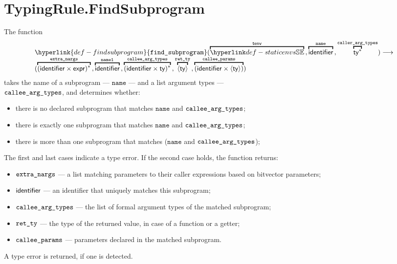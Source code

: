 \documentclass{book}
\newcommand\findsubprogram[0]{\hyperlink{def-findsubprogram}{\texttt{find\_subprogram}}}
\newcommand\nameone[0]{\texttt{name1}}
\newcommand\name[0]{\texttt{name}}
\begin{document}

\section{TypingRule.FindSubprogram \label{sec:TypingRule.FindSubprogram}}
\hypertarget{def-findsubprogram}{}
The function
\[
  \begin{array}{l}
    \findsubprogram(
      \overname{\staticenvs}{\tenv} \aslsep
      \overname{\identifier}{\name} \aslsep
      \overname{\ty^*}{\callerargtypes}
     ) \aslto \\
    (
      \overname{(\identifier\times\expr)^*}{\extranargs} \aslsep
      \overname{\identifier}{\nameone} \aslsep
      \overname{(\identifier\times\ty)^*}{\calleeargtypes} \aslsep
      \overname{\langle\ty\rangle}{\retty} \aslsep
      \overname{(\identifier \times \langle\ty\rangle)}{\calleeparams}
    )
  \end{array}
\]
takes the name of a subprogram --- $\name$ --- and a list argument types --- \\ $\texttt{callee\_arg\_types}$,
and determines whether:
\begin{itemize}
  \item there is no declared subprogram that matches $\name$ and $\texttt{callee\_arg\_types}$;
  \item there is exactly one subprogram that matches $\name$ and $\texttt{callee\_arg\_types}$;
  \item there is more than one subprogram that matches ($\name$ and $\texttt{callee\_arg\_types}$);
\end{itemize}
The first and last cases indicate a type error.
If the second case holds, the function returns:
\begin{itemize}
\item $\texttt{extra\_nargs}$ --- a list matching parameters to their caller expressions based on bitvector parameters;
\item $\textsf{identifier}$ --- an identifier that uniquely matches this subprogram;
\item $\texttt{callee\_arg\_types}$ --- the list of formal argument types of the matched subprogram;
\item $\texttt{ret\_ty}$ --- the type of the returned value, in case of a function or a getter;
\item $\texttt{callee\_params}$ --- parameters declared in the matched subprogram.
\end{itemize}
A type error is returned, if one is detected.
\end{document}

